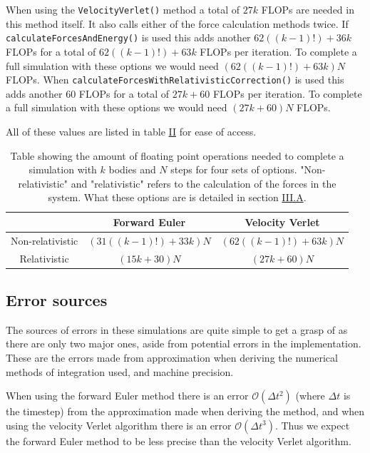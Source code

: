 \documentclass[reprint,english,notitlepage]{revtex4-1}  %
\begin{document}
When using the \verb+VelocityVerlet()+ method a total of $27k$ FLOPs are needed in this method itself. It also calls either of the force calculation methods twice. If \verb+calculateForcesAndEnergy()+ is used this adds another $62((k-1)!) + 36k$ FLOPs for a total of $62((k-1)!) + 63k$ FLOPs per iteration. To complete a full simulation with these options we would need $(62((k-1)!) + 63k)N$ FLOPs. When \verb+calculateForcesWithRelativisticCorrection()+ is used this adds another $60$ FLOPs for a total of $27k + 60$ FLOPs per iteration. To complete a full simulation with these options we would need $(27k + 60)N$ FLOPs.

All of these values are listed in table \hyperref[table:III:b:i]{II} for ease of access. \newline

\begin{table}[H]
\caption{Table showing the amount of floating point operations needed to complete a simulation with $k$ bodies and $N$ steps for four sets of options. "Non-relativistic" and "relativistic" refers to the calculation of the forces in the system. What these options are is detailed in section \hyperref[sec:III:a]{III.A}.}
\begin{tabular}{|c|c|c|}
\hline
 & Forward Euler & Velocity Verlet \\
\hline
Non-relativistic & $(31((k-1)!) + 33k)N$ & $(62((k-1)!) + 63k)N$ \\
Relativistic & $(15k + 30)N$ & $(27k + 60)N$ \\
\hline
\end{tabular}
\label{table:III:b:i}
\end{table}


\subsection{Error sources} \label{sec:III:c}

The sources of errors in these simulations are quite simple to get a grasp of as there are only two major ones, aside from potential errors in the implementation. These are the errors made from approximation when deriving the numerical methods of integration used, and machine precision.

When using the forward Euler method there is an error $\mathcal{O}(\Delta t^2)$ (where $\Delta t$ is the timestep) from the approximation made when deriving the method, and when using the velocity Verlet algorithm there is an error $\mathcal{O}(\Delta t^3)$. Thus we expect the forward Euler method to be less precise than the velocity Verlet algorithm.
\end{document}
